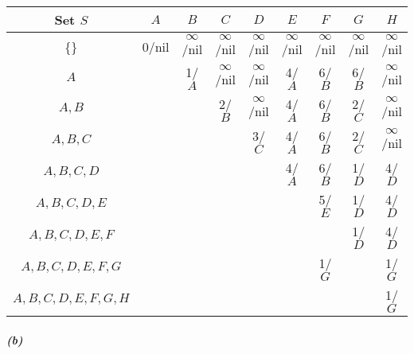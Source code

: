 \documentclass[12pt]{article}
\begin{document}
\begin{center}
\begin{tabular}{ | c | c | c | c | c | c | c | c | c |}
\hline
Set $S$ & $A$ & $B$ & $C$ & $D$ & $E$ & $F$ & $G$ & $H$ \\ \hline
\{\} & 0/nil & $\infty$/nil & $\infty$/nil & $\infty$/nil & $\infty$/nil
& $\infty$/nil & $\infty$/nil & $\infty$/nil \\ \hline
$A$ & & 1/$A$ & $\infty$/nil & $\infty$/nil & 4/$A$ & 6/$B$ & 6/$B$ & $\infty$/nil \\ \hline
$A,B$ & & & 2/$B$ & $\infty$/nil & 4/$A$ & 6/$B$ & 2/$C$ & $\infty$/nil \\ \hline
$A,B,C$ & & & & 3/$C$ & 4/$A$ & 6/$B$ & 2/$C$ & $\infty$/nil \\ \hline
$A,B,C,D$ & & & & & 4/$A$ & 6/$B$ & 1/$D$ & 4/$D$ \\ \hline
$A,B,C,D,E$ & & & & & & 5/$E$ & 1/$D$ & 4/$D$ \\ \hline
$A,B,C,D,E,F$ & & & & & & & 1/$D$ & 4/$D$ \\ \hline
$A,B,C,D,E,F,G$ & & & & & & 1/$G$ & & 1/$G$ \\ \hline
$A,B,C,D,E,F,G,H$ & & & & & & & & 1/$G$ \\ \hline
\end{tabular}
\end{center} 

\subparagraph{(b)}
\end{document}
